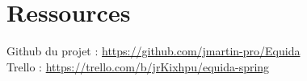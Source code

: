 \chapter{Ressources}

\noindent
Github du projet : \url{https://github.com/jmartin-pro/Equida}\\
Trello : \url{https://trello.com/b/jrKixhpu/equida-spring}
